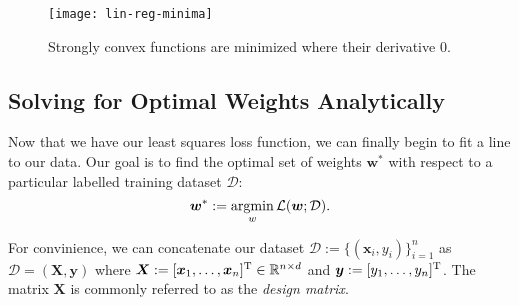 \begin{figure}
    \centering
    \texttt{[image: lin-reg-minima]}
    \caption{Strongly convex functions are minimized where their derivative 0.}
    \label{fig:lin-reg-minima}
\end{figure}

\subsection{Solving for Optimal Weights Analytically}
Now that we have our least squares loss function, we can finally begin to fit a line to our data. Our goal is to find the optimal set of weights $\bm{w}^*$ with respect to a particular labelled training dataset $\mathcal{D}$: $$\bm{w}^* := \operatorname*{argmin}_w \mathcal{L}(\bm{w}; \mathcal{D}).$$

For convinience, we can concatenate our dataset $\mathcal{D} := \{(\bm{x}_i, y_i)\}_{i=1}^{n}$ as $\mathcal{D} = (\bm{X}, \bm{y})$ where $\bm{X} := [\bm{x}_1, \ldots, \bm{x}_n]^{\mathrm T} \in \mathbb{R}^{n \times d}$ and $\bm{y} := [y_1, \ldots, y_n]^{\mathrm T}$. The matrix $\bm{X}$ is commonly referred to as the \emph{design matrix}.

